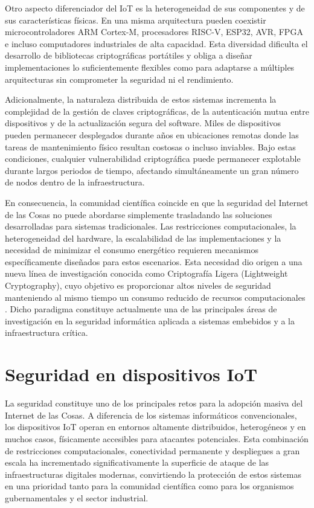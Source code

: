 Otro aspecto diferenciador del IoT es la heterogeneidad de sus componentes y de sus características físicas. En una misma arquitectura pueden coexistir microcontroladores ARM Cortex-M, procesadores RISC-V, ESP32, AVR, FPGA e incluso computadores industriales de alta capacidad. Esta diversidad dificulta el desarrollo de bibliotecas criptográficas portátiles y obliga a diseñar implementaciones lo suficientemente flexibles como para adaptarse a múltiples arquitecturas sin comprometer la seguridad ni el rendimiento.

Adicionalmente, la naturaleza distribuida de estos sistemas incrementa la complejidad de la gestión de claves criptográficas, de la autenticación mutua entre dispositivos y de la actualización segura del software. Miles de dispositivos pueden permanecer desplegados durante años en ubicaciones remotas donde las tareas de mantenimiento físico resultan costosas o incluso inviables. Bajo estas condiciones, cualquier vulnerabilidad criptográfica puede permanecer explotable durante largos periodos de tiempo, afectando simultáneamente un gran número de nodos dentro de la infraestructura.

En consecuencia, la comunidad científica coincide en que la seguridad del Internet de las Cosas no puede abordarse simplemente trasladando las soluciones desarrolladas para sistemas tradicionales. Las restricciones computacionales, la heterogeneidad del hardware, la escalabilidad de las implementaciones y la necesidad de minimizar el consumo energético requieren mecanismos específicamente diseñados para estos escenarios. Esta necesidad dio origen a una nueva línea de investigación conocida como Criptografía Ligera (Lightweight Cryptography), cuyo objetivo es proporcionar altos niveles de seguridad manteniendo al mismo tiempo un consumo reducido de recursos computacionales \cite{McKay2017ReportCryptography,NationalInstituteofStandards2023AnnouncingSelection}. Dicho paradigma constituye actualmente una de las principales áreas de investigación en la seguridad informática aplicada a sistemas embebidos y a la infraestructura crítica.



\section{Seguridad en dispositivos IoT}

La seguridad constituye uno de los principales retos para la adopción masiva del Internet de las Cosas. A diferencia de los sistemas informáticos convencionales, los dispositivos IoT operan en entornos altamente distribuidos, heterogéneos y en muchos casos, físicamente accesibles para atacantes potenciales. Esta combinación de restricciones computacionales, conectividad permanente y despliegues a gran escala ha incrementado significativamente la superficie de ataque de las infraestructuras digitales modernas, convirtiendo la protección de estos sistemas en una prioridad tanto para la comunidad científica como para los organismos gubernamentales y el sector industrial.


